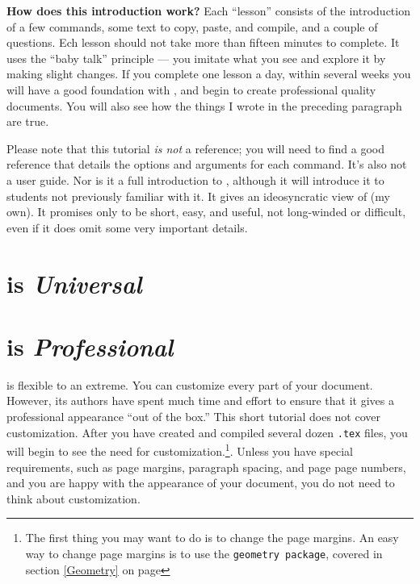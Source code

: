 \documentclass[letterpaper]{article}
\begin{document}
    \textbf{How does this introduction work?} Each ``lesson'' consists of the introduction of a few commands, some text to copy, paste, and compile, and a couple of questions. Ech lesson should not take more than fifteen minutes to complete. It uses the ``baby talk'' principle --- you imitate what you see and explore it by making slight changes. If you complete one lesson a day, within several weeks you will have a good foundation with \LaTeXe{}, and begin to create professional quality documents. You will also see how the things I wrote in the preceding paragraph are true.

    Please note that this tutorial \textit{is not} a \LaTeXe{} reference; you will need to find a good reference that details the options and arguments for each command. It's also not a user guide. Nor is it a full introduction to \LaTeXe{}, although it will introduce it to students not previously familiar with it. It gives an ideosyncratic view of \LaTeXe{} (my own). It promises only to be short, easy, and useful, not long-winded or difficult, even if it does omit some very important details. 

    

    \section*{\LaTeXe{} is \textit{Universal}}

    

    \section*{\LaTeXe{} is \textit{Professional}}

    \LaTeXe{} is flexible to an extreme. You can customize every part of your document. However, its authors have spent much time and effort to ensure that it gives a professional appearance ``out of the box.'' This short tutorial does not cover customization. After you have created and compiled several dozen \texttt{.tex} files, you will begin to see the need for customization.\footnote{The first thing you may want to do is to change the page margins. An easy way to change page margins is to use the \texttt{geometry package}, covered in section \ref{Geometry} on page \pageref{Geometry}}. Unless you have special requirements, such as page margins, paragraph spacing, and page page numbers, and you are happy with the appearance of your document, you do not need to think about customization.
\end{document}
